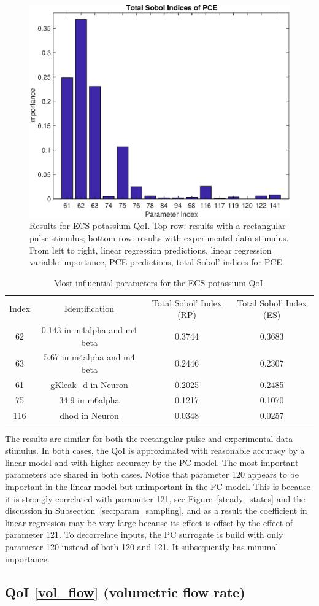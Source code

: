 \documentclass[12pt]{article}
\numberwithin{equation}{section}
\begin{document}
\begin{figure}[h]
\includegraphics[width=.24 \textwidth]{Figures/K_ECS_Mean_QoI_PCE_SI_Experimental.eps}
\caption{Results for ECS potassium QoI. Top row: results with a rectangular pulse stimulus; bottom row: results with experimental data stimulus. From left to right, linear regression predictions, linear regression variable importance, PCE predictions, total Sobol' indices for PCE.}
\label{fig:K_ECS_Mean}
\end{figure}

\begin{table}[h]
\centering
\begin{tabular}{cccc}
Index & Identification & Total Sobol' Index (RP) & Total Sobol' Index (ES)\\
62 & 0.143 in m4alpha and m4 beta &  0.3744 & 0.3683\\
63 & 5.67 in m4alpha and m4 beta & 0.2446 & 0.2307\\
61 & gKleak\_d in Neuron & 0.2025 & 0.2485\\
75 & 34.9 in m6alpha & 0.1217 & 0.1070\\
116 & dhod in Neuron &  0.0348 & 0.0257\\
\end{tabular}
\caption{Most influential parameters for the ECS potassium QoI.}
\label{tab:K_ECS_Mean}
\end{table}

The results are similar for both the rectangular pulse and experimental data stimulus. In both cases, the QoI is approximated with reasonable accuracy by a linear model and with higher accuracy by the PC model. The most important parameters are shared in both cases. Notice that parameter 120 appears to be important in the linear model but unimportant in the PC model. This is because it is strongly correlated with parameter 121, see Figure~\ref{steady_states} and the discussion in Subsection~\ref{sec:param_sampling}, and as a result the coefficient in linear regression may be very large because its effect is offset by the effect of parameter 121. To decorrelate inputs, the PC surrogate is build with only parameter 120 instead of both 120 and 121. It subsequently has minimal importance.

\subsection{QoI \eqref{vol_flow} (volumetric flow rate)}
\end{document}
